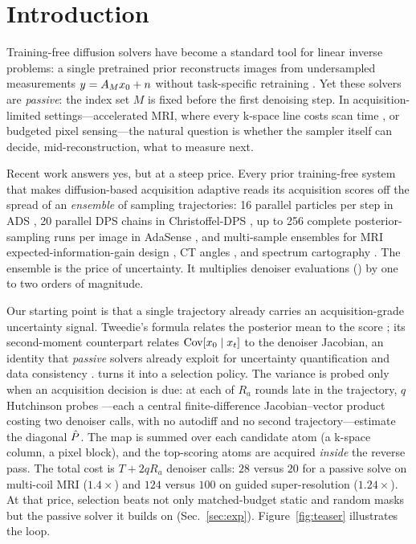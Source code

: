 \section{Introduction}\label{sec:intro}

Training-free diffusion solvers have become a standard tool for linear inverse
problems: a single pretrained prior reconstructs images from undersampled
measurements $y = A_M x_0 + n$ without task-specific retraining
\cite{kawar2022ddrm,chung2023dps,song2023pigdm,wang2023ddnm}. Yet these solvers
are \emph{passive}: the index set $M$ is fixed before the first denoising
step. In acquisition-limited settings---accelerated MRI, where every k-space
line costs scan time \cite{zbontar2018fastmri}, or budgeted pixel
sensing---the natural question is whether the sampler itself can decide,
mid-reconstruction, what to measure next.

Recent work answers yes, but at a steep price. Every prior training-free
system that makes diffusion-based acquisition adaptive
\cite{elata2024adasense,nolan2025ads,barba2025dal,iollo2025bedmri,gu2025gsc,christoffel2026dps}
reads its acquisition scores off the spread of an \emph{ensemble} of sampling
trajectories: 16 parallel particles per step in ADS \cite{nolan2025ads}, 20
parallel DPS chains in Christoffel-DPS \cite{christoffel2026dps}, up to 256
complete posterior-sampling runs per image in AdaSense
\cite{elata2024adasense}, and multi-sample ensembles for MRI
expected-information-gain design \cite{iollo2025bedmri}, CT angles
\cite{barba2025dal}, and spectrum cartography \cite{gu2025gsc}. The ensemble
is the price of uncertainty. It multiplies denoiser evaluations (\nfe) by one
to two orders of magnitude.

Our starting point is that a single trajectory already carries an
acquisition-grade uncertainty signal. Tweedie's formula relates the posterior
mean to the score \cite{efron2011tweedie,robbins1956empirical}; its
second-moment counterpart relates $\mathrm{Cov}[x_0 \mid x_t]$ to the denoiser
Jacobian, an identity that \emph{passive} solvers already exploit for
uncertainty quantification and data consistency
\cite{manor2024posterior,boys2024tmpd,peng2024covariance,hamidi2024cadps,rissanen2025freehunch,schioppa2026covaware}.
\pvas{} turns it into a selection policy. The variance is probed only when an
acquisition decision is due: at each of $R_a$ rounds late in the trajectory,
$q$ Hutchinson probes \cite{hutchinson1990trace}---each a central
finite-difference Jacobian--vector product costing two denoiser calls, with no
autodiff and no second trajectory---estimate the diagonal $\hat{P}$. The map is
summed over each candidate atom (a k-space column, a pixel block), and the
top-scoring atoms are acquired \emph{inside} the reverse pass. The total cost
is $T + 2qR_a$ denoiser calls: $28$ versus $20$ for a passive solve on
multi-coil MRI ($1.4\times$) and $124$ versus $100$ on guided super-resolution
($1.24\times$). At that price, selection beats not only matched-budget static
and random masks but the passive solver it builds on
(Sec.~\ref{sec:exp}). Figure~\ref{fig:teaser} illustrates the loop.

